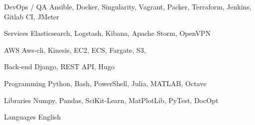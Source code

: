 

\begin{cvskills}

  \cvskill
    {DevOps / QA} %
    {Ansible, Docker, Singularity, Vagrant, Packer, Terraform, Jenkins, Gitlab CI, JMeter} %

  \cvskill
    {Services} %
    {Elasticsearch, Logstash, Kibana, Apache Storm, OpenVPN} %

  \cvskill
    {AWS} %
    {Aws-cli, Kinesis, EC2, ECS, Fargate, S3, } %

  \cvskill
    {Back-end} %
    {Django, REST API, Hugo} %

  \cvskill
    {Programming} %
    {Python, Bash, PowerShell, Julia, MATLAB, Octave} %

  \cvskill
    {Libraries} %
    {Numpy, Pandas, SciKit-Learn, MatPlotLib, PyTest, DocOpt} %

  \cvskill
    {Languages} %
    {English} %

\end{cvskills}
